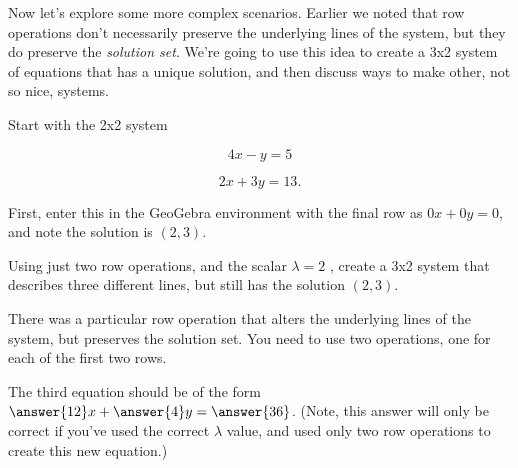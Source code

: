 \documentclass{ximera}
\begin{document}
    
    
    Now let's explore some more complex scenarios. Earlier we noted that row operations don't necessarily preserve the underlying lines of the system, but they do preserve the \emph{solution set}. We're going to use this idea to create a 3x2 system of equations that has a unique solution, and then discuss ways to make other, not so nice, systems.
    
    
    
    
    
    
    
    
    
    \begin{example}
    
        Start with the 2x2 system 
    
        $$4x-y=5$$
    
        $$2x+3y=13.$$
    
        First, enter this in the GeoGebra environment with the final row as $0x+0y=0$, and note the solution is $(2,3)$.
    
        Using just two row operations, and the scalar %
        $\lambda=2$
        , create a 3x2 system that describes three different lines, but still has the solution $(2,3)$.
    
        \begin{hint}
    
            There was a particular row operation that alters the underlying lines of the system, but preserves the solution set. You need to use two operations, one for each of the first two rows.
    
        \end{hint}
    
        The third equation should be of the form $\answer{12}x+\answer{4}y=\answer{36}$.
        (Note, this answer will only be correct if you've used the correct $\lambda$ value, and used only two row operations to create this new equation.)
    
    
    \end{example}
    
\end{document}
